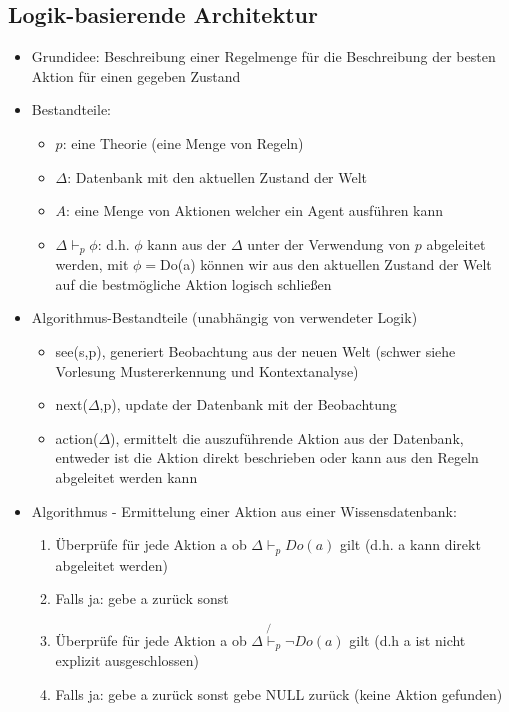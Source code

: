 \documentclass{article} %
\begin{document}
	\subsection{Logik-basierende Architektur}
	\begin{itemize}
		\item Grundidee: Beschreibung einer Regelmenge für die Beschreibung der besten Aktion für einen gegeben Zustand
		\item Bestandteile:
		\begin{itemize}
			\item $p$: eine Theorie (eine Menge von Regeln)
			\item $\Delta$: Datenbank mit den aktuellen Zustand der Welt
			\item $A$: eine Menge von Aktionen welcher ein Agent ausführen kann
			\item $\Delta\vdash_{p}\phi$: d.h. $\phi$ kann aus der $\Delta$ unter der Verwendung von $p$ abgeleitet werden, mit $\phi=$Do(a) können wir aus den aktuellen Zustand der Welt auf die bestmögliche Aktion logisch schließen
		\end{itemize}
		 \item Algorithmus-Bestandteile (unabhängig von verwendeter Logik)
		 \begin{itemize}
		 	\item see(s,p), generiert Beobachtung aus der neuen Welt (schwer siehe Vorlesung Mustererkennung und Kontextanalyse)
		 	\item next($\Delta$,p), update der Datenbank mit der Beobachtung
		 	\item action($\Delta$), ermittelt die auszuführende Aktion aus der Datenbank, entweder ist die Aktion direkt beschrieben oder kann aus den Regeln abgeleitet werden kann
		 \end{itemize}
		 \item Algorithmus - Ermittelung einer Aktion aus einer Wissensdatenbank:
		 \begin{enumerate}
		 	\item Überprüfe für jede Aktion a ob  $\Delta\vdash_{p}Do(a)$ gilt (d.h. a kann direkt abgeleitet werden)
		 	\item Falls ja: gebe a zurück sonst
		 	\item Überprüfe für jede Aktion a ob $\Delta\not{\vdash}_{p}\neg Do(a)$ gilt (d.h a ist nicht explizit ausgeschlossen)
		 	\item Falls ja: gebe a zurück sonst gebe NULL zurück (keine Aktion gefunden)
		 \end{enumerate}
	\end{itemize}
\end{document}
